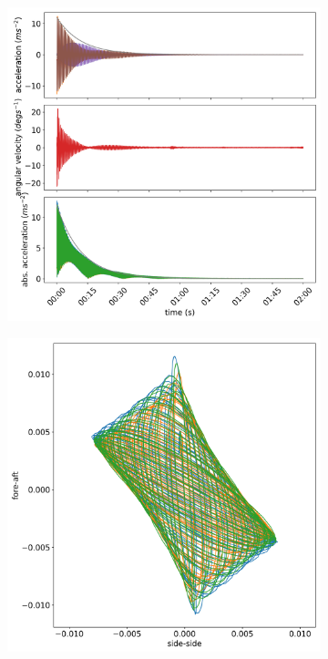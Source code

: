 \documentclass{article}
\begin{document}

\begin{figure}[ht]

    \centering
    \begin{subfigure}[b]{0.45\textwidth}
        \centering
        \includegraphics[width=\textwidth]{../results/experiment/low_mass_acceleration.png}
        \caption{}
        \label{fig:low-mass:acc}
    \end{subfigure}
    \begin{subfigure}[b]{0.45\textwidth}
        \centering
        \includegraphics[width=\textwidth]{../results/experiment/low_mass_orbit.png}

\end{subfigure}
\end{figure}
\end{document}
